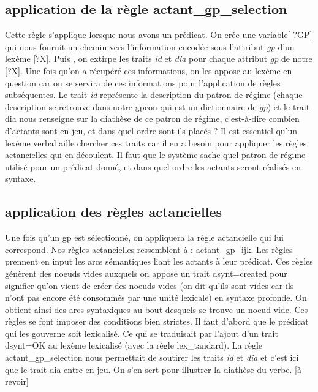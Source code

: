 \documentclass[12pt,maitrise,frenchb,natbib,twoside,initial]{dms}
\numberwithin{equation}{section}
\numberwithin{table}{chapter}
\numberwithin{figure}{chapter}
\begin{document}
\subsection{application de la règle actant{\_}gp{\_}selection}
Cette règle s'applique lorsque nous avons un prédicat.
On crée une variable[ ?GP] qui nous fournit un chemin vers l'information encodée sous l'attribut \emph{ gp} d'un lexème [?X]. Puis , on extirpe les traits \emph{ id} et \emph{dia} pour chaque attribut\emph{ gp} de notre [?X]. Une fois qu'on a récupéré ces informations, on les appose au lexème en question car on se servira de ces informations pour l'application de règles subséquentes. Le trait \emph{ id} représente la description du patron de régime (chaque description se retrouve dans notre gpcon qui est un dictionnaire de\emph{ gp}) et le trait dia nous renseigne sur la diathèse de ce patron de régime, c'est-à-dire combien d'actants sont en jeu, et dans quel ordre sont-ils placés ? Il est essentiel qu'un lexème verbal aille chercher ces traits car il en a besoin pour appliquer les règles actancielles qui en découlent. Il faut que le système sache quel patron de régime utilisé pour un prédicat donné, et dans quel ordre les actants seront réalisés en syntaxe.

\subsection{application des règles actancielles}
Une fois qu'un gp est sélectionné, on appliquera la règle actancielle qui lui correspond. Nos règles actancielles ressemblent à : actant{\_}gp{\_}ijk. Les règles prennent en input les arcs sémantiques liant les actants à leur prédicat. Ces règles génèrent des noeuds vides auxquels on appose un trait dsynt=created pour signifier qu'on vient de créer des noeuds vides (on dit qu'ils sont vides car ils n'ont pas encore été consommés par une unité lexicale) en syntaxe profonde. On obtient ainsi des arcs syntaxiques au bout desquels se trouve un noeud vide. Ces règles se font imposer des conditions bien strictes. Il faut d'abord que le prédicat qui les gouverne soit lexicalisé. Ce qui se traduisait par l'ajout d'un trait dsynt=OK au lexème lexicalisé (avec la règle lex{\_}tandard). La règle actant{\_}gp{\_}selection nous permettait de soutirer les traits  \emph{ id} et \emph{dia} et c'est ici que le trait dia entre en jeu. On s'en sert pour illustrer la diathèse du verbe. [à revoir]
\end{document}
